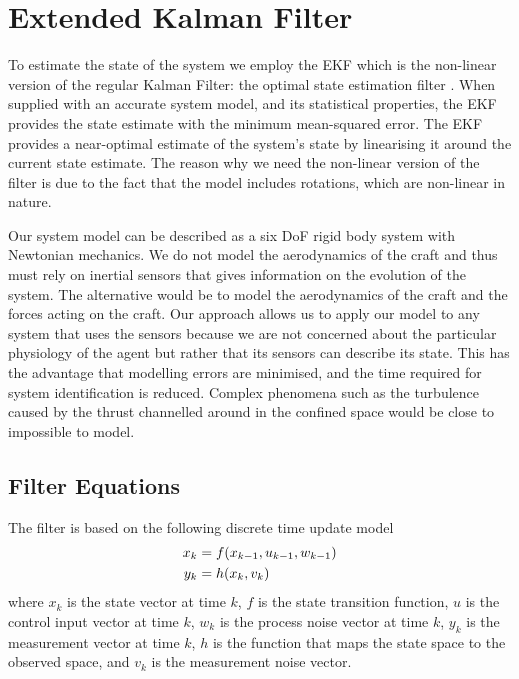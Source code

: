 \documentclass[]{article}
\begin{document}
{%

\clearpage %
\section{Extended Kalman Filter} %
\label{sec:ekf}

To estimate the state of the system we employ the EKF which is the non-linear version of the regular Kalman Filter: the optimal state estimation filter \cite{todo}. When supplied with an accurate system model, and its statistical properties, the EKF provides the state estimate with the minimum mean-squared error.
The EKF provides a near-optimal estimate of the system's state by linearising it around the current state estimate. The reason why we need the non-linear version of the filter is due to the fact that the model includes rotations, which are non-linear in nature.


Our system model can be described as a six DoF rigid body system with Newtonian mechanics. We do not model the aerodynamics of the craft and thus must rely on inertial sensors that gives information on the evolution of the system\cite{OpenPilotPaper}. The alternative would be to model the aerodynamics of the craft and the forces acting on the craft. Our approach allows us to apply our model to any system that uses the sensors because we are not concerned about the particular physiology of the agent but rather that its sensors can describe its state.
This has the advantage that modelling errors are minimised, and the time required for system identification is reduced.
Complex phenomena such as the turbulence caused by the thrust channelled around in the confined space would be close to impossible to model.

\subsection{Filter Equations} %
\label{sub:filter_equations}

The filter is based on the following discrete time update model
\begin{align}
	x_k &= f(x_{k-1}, u_{k-1}, w_{k-1}) \notag \\
	y_k &= h(x_k, v_k)
	\label{eqn:system}
\end{align}
where $x_k$ is the state vector at time $k$, $f$ is the state transition function, $u$ is the control input vector at time $k$, $w_k$ is the process noise vector at time $k$, $y_k$ is the measurement vector at time $k$, $h$ is the function that maps the state space to the observed space, and $v_k$ is the measurement noise vector.

}
\end{document}
